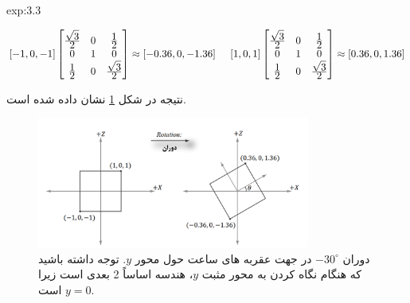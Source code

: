 {\begin{spacing}{1.5}
\begin{example}{exp:3.3}
            \begin{center}
                $[-1,0,-1]\begin{bmatrix}
                              \frac{\displaystyle \sqrt{\displaystyle 3}}{\displaystyle 2} & 0 & \frac{\displaystyle 1}{\displaystyle 2}                      \\
                              0                                                            & 1 & 0                                                            \\
                              \frac{\displaystyle 1}{\displaystyle 2}                      & 0 & \frac{\displaystyle \sqrt{\displaystyle 3}}{\displaystyle 2}
                \end{bmatrix}\approx[-0.36,0,-1.36]\hspace{5 mm}[1,0,1]\begin{bmatrix}
                                                                           \frac{\displaystyle \sqrt{\displaystyle 3}}{\displaystyle 2} & 0 & \frac{\displaystyle 1}{\displaystyle 2}                      \\
                                                                           0                                                            & 1 & 0                                                            \\
                                                                           \frac{\displaystyle 1}{\displaystyle 2}                      & 0 & \frac{\displaystyle \sqrt{\displaystyle 3}}{\displaystyle 2}
                \end{bmatrix}\approx[0.36,0,1.36]$
            \end{center}

            نتیجه در شکل \ref{fig:4.Session.1.3.4} نشان داده شده است.

            \begin{figure}[H]
                \centering
                \setlength{\belowcaptionskip}{-10pt}
                \includegraphics[width=0.8\textwidth]{Images/4/3/4.Session.1.3.4}
                \caption {دوران $-30^\circ$ در جهت عقربه های ساعت حول محور $y$.
                توجه داشته باشید که هنگام نگاه کردن به محور مثبت $y$، هندسه اساساً 2 بعدی است زیرا $y=0$ است.}
                \label{fig:4.Session.1.3.4}
            \end{figure}
        \end{example}
    \end{spacing}
}


